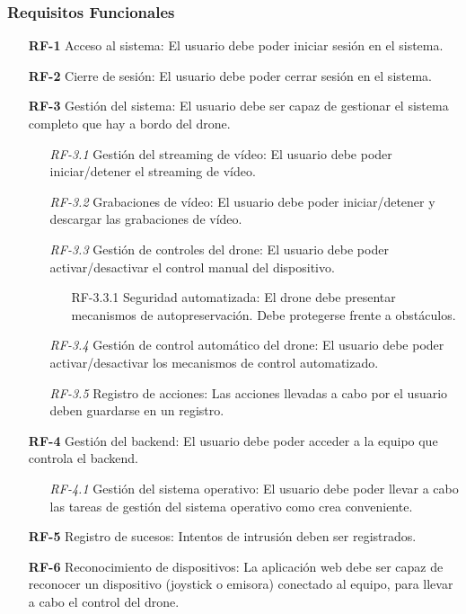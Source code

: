 \subsubsection{Requisitos Funcionales}
\begin{itemize}
\item[\textbf{RF-1}] Acceso al sistema: El usuario debe poder iniciar sesión en el sistema.

\item[\textbf{RF-2}] Cierre de sesión: El usuario debe poder cerrar sesión en el sistema.

\item[\textbf{RF-3}] Gestión del sistema: El usuario debe ser capaz de gestionar el sistema completo que hay a bordo del drone.

	\begin{itemize}

			\item[\textit{RF-3.1}] Gestión del streaming de vídeo: El usuario debe poder iniciar/detener el streaming de vídeo.
			\item[\textit{RF-3.2}] Grabaciones de vídeo: El usuario debe poder iniciar/detener y descargar las grabaciones de vídeo.
			\item[\textit{RF-3.3}] Gestión de controles del drone: El usuario debe poder activar/desactivar el control manual del dispositivo.
				\begin{itemize}
					\item[RF-3.3.1] Seguridad automatizada: El drone debe presentar mecanismos de autopreservación. Debe protegerse frente a obstáculos.
				\end{itemize}
			\item[\textit{RF-3.4}] Gestión de control automático del drone: El usuario debe poder activar/desactivar los mecanismos de control automatizado.

		\item[\textit{RF-3.5}] Registro de acciones: Las acciones llevadas a cabo por el usuario deben guardarse en un registro.
		\end{itemize}
		
\item[\textbf{RF-4}] Gestión del backend: El usuario debe poder acceder a la equipo que controla el backend.
			\begin{itemize}
				\item[\textit{RF-4.1}] Gestión del sistema operativo: El usuario debe poder llevar a cabo las tareas de gestión del sistema operativo como crea conveniente.
			\end{itemize}		
	

\item[\textbf{RF-5}] Registro de sucesos: Intentos de intrusión deben ser registrados.

\item[\textbf{RF-6}] Reconocimiento de dispositivos: La aplicación web debe ser capaz de reconocer un dispositivo (joystick o emisora) conectado al equipo, para llevar a cabo el control del drone.


\end{itemize}


